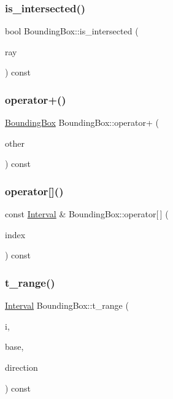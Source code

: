 \subsubsection{\texorpdfstring{is\_intersected()}{is\_intersected()}}
{\footnotesize\ttfamily bool Bounding\+Box\+::is\+\_\+intersected (\begin{DoxyParamCaption}\item[{const \mbox{\hyperlink{classRay}{Ray}} \&}]{ray }\end{DoxyParamCaption}) const}

\mbox{\label{classBoundingBox_ac5d589d5d2075f7b65b8b2fdf0f11411}} 
\subsubsection{\texorpdfstring{operator+()}{operator+()}}
{\footnotesize\ttfamily \mbox{\hyperlink{classBoundingBox}{Bounding\+Box}} Bounding\+Box\+::operator+ (\begin{DoxyParamCaption}\item[{const \mbox{\hyperlink{classBoundingBox}{Bounding\+Box}} \&}]{other }\end{DoxyParamCaption}) const}

\mbox{\label{classBoundingBox_a75b856c3d4fb4b1ffd3132af52d3d3fd}} 
\subsubsection{\texorpdfstring{operator[]()}{operator[]()}}
{\footnotesize\ttfamily const \mbox{\hyperlink{classInterval}{Interval}} \& Bounding\+Box\+::operator\mbox{[}$\,$\mbox{]} (\begin{DoxyParamCaption}\item[{unsigned int}]{index }\end{DoxyParamCaption}) const}

\mbox{\label{classBoundingBox_aa4e823e93add25a2110090d41df96150}} 
\subsubsection{\texorpdfstring{t\_range()}{t\_range()}}
{\footnotesize\ttfamily \mbox{\hyperlink{classInterval}{Interval}} Bounding\+Box\+::t\+\_\+range (\begin{DoxyParamCaption}\item[{const \mbox{\hyperlink{classInterval}{Interval}} \&}]{i,  }\item[{double}]{base,  }\item[{double}]{direction }\end{DoxyParamCaption}) const\hspace{0.3cm}{\ttfamily [private]}}



